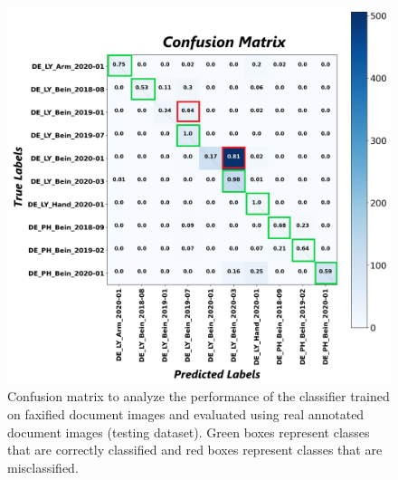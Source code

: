 

\begin{figure}[H]
    \begin{center}
	\includegraphics[scale=0.20]{images/Evaluation/Confusion_Matrix_Faxified_Data_Classifier_2021-05-31_19-31-35.png}
	\caption[Confusion matrix to analyze the performance of the classifier trained on faxified document images and evaluated using real annotated document images (test dataset).]{Confusion matrix to analyze the performance of the classifier trained on faxified document images and evaluated using real annotated document images (testing dataset). Green boxes represent classes that are correctly classified and red boxes represent classes that are misclassified.}
	\label{fig:CMFaxifiedDocumentImagesClassifier}
	\end{center}
\end{figure}

